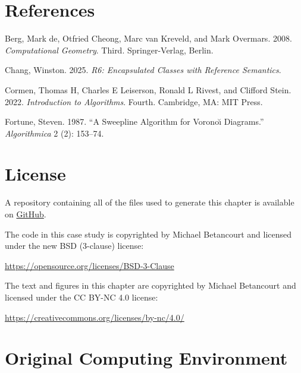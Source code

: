\documentclass[
  letterpaper,
  DIV=11,
  numbers=noendperiod]{scrartcl}
\newlength{\cslhangindent}
\newenvironment{CSLReferences}[2] %
 {\begin{list}{}{%
  \setlength{\itemindent}{0pt}
  \setlength{\leftmargin}{0pt}
  \setlength{\parsep}{0pt}
  \ifodd #1
   \setlength{\leftmargin}{\cslhangindent}
   \setlength{\itemindent}{-1\cslhangindent}
  \fi
  \setlength{\itemsep}{#2\baselineskip}}}
 {\end{list}}
\begin{document}
\section*{References}\label{references}

\label{refs}
\begin{CSLReferences}{1}{0}
Berg, Mark de, Otfried Cheong, Marc van Kreveld, and Mark Overmars.
2008. \emph{Computational Geometry}. Third. Springer-Verlag, Berlin.

Chang, Winston. 2025. \emph{R6: Encapsulated Classes with Reference
Semantics}.

Cormen, Thomas H, Charles E Leiserson, Ronald L Rivest, and Clifford
Stein. 2022. \emph{Introduction to Algorithms}. Fourth. Cambridge, MA:
MIT Press.

Fortune, Steven. 1987. {``A Sweepline Algorithm for {V}oronoı̆
Diagrams.''} \emph{Algorithmica} 2 (2): 153--74.

\end{CSLReferences}

\section*{License}\label{license}

A repository containing all of the files used to generate this chapter
is available on
\href{https://github.com/betanalpha/quarto_misc/tree/main/voronoi}{GitHub}.

The code in this case study is copyrighted by Michael Betancourt and
licensed under the new BSD (3-clause) license:

\url{https://opensource.org/licenses/BSD-3-Clause}

The text and figures in this chapter are copyrighted by Michael
Betancourt and licensed under the CC BY-NC 4.0 license:

\url{https://creativecommons.org/licenses/by-nc/4.0/}

\section*{Original Computing
Environment}\label{original-computing-environment}
\end{document}
